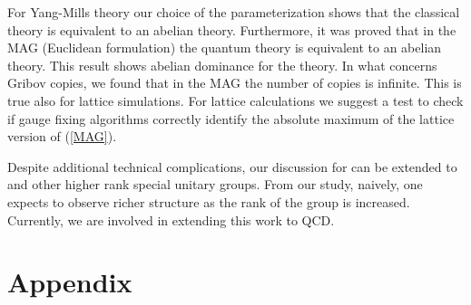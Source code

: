 \documentclass[a4paper,a4paper]{article}
\begin{document}
For \coordHE{} Yang-Mills theory our choice of the parameterization shows
that the classical theory is equivalent to an abelian theory. 
Furthermore, it was proved that in the MAG (Euclidean formulation) 
the quantum theory is equivalent to an abelian theory. This
result shows abelian dominance for the \coordHE{} theory. In what concerns
Gribov copies, we found that in the MAG the number of copies is
infinite. This is true also for lattice simulations.
For lattice calculations we suggest a test to check
if gauge fixing algorithms correctly identify the absolute maximum of
the lattice version of (\ref{MAG}).

Despite additional technical complications, our discussion for \coordHE{} can 
be extended to \coordHE{} \cite{OO3} and other higher rank special unitary 
groups. From our study, naively, one expects to observe richer structure 
as the rank of the group is increased. Currently, we are 
involved in extending this work to QCD.



\section*{Appendix}
\end{document}
